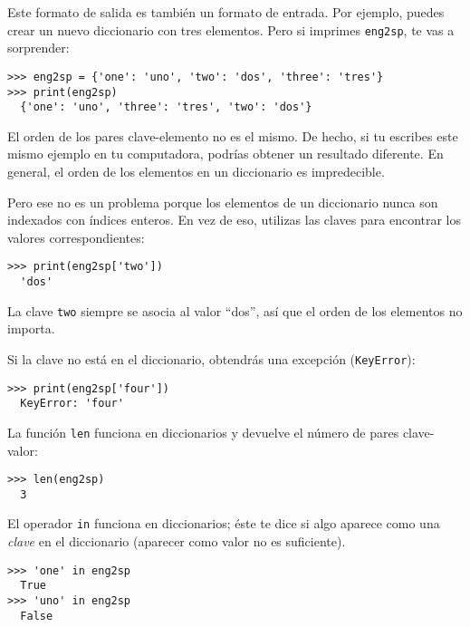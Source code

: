 Este formato de salida es también un formato de entrada. Por ejemplo,
puedes crear un nuevo diccionario con tres elementos. Pero si imprimes
\texttt{eng2sp}, te vas a sorprender:


\begin{Verbatim}[frame=single]
>>> eng2sp = {'one': 'uno', 'two': 'dos', 'three': 'tres'}
>>> print(eng2sp)
  {'one': 'uno', 'three': 'tres', 'two': 'dos'}
\end{Verbatim}


El orden de los pares clave-elemento no es el mismo. De hecho, si tu
escribes este mismo ejemplo en tu computadora, podrías obtener un
resultado diferente. En general, el orden de los elementos en un
diccionario es impredecible.

Pero ese no es un problema porque los elementos de un diccionario nunca
son indexados con índices enteros. En vez de eso, utilizas las claves
para encontrar los valores correspondientes:


\begin{Verbatim}[frame=single]
>>> print(eng2sp['two'])
  'dos'
\end{Verbatim}


La clave \texttt{\textquotesingle{}two\textquotesingle{}} siempre se
asocia al valor ``dos'', así que el orden de los elementos no importa.

Si la clave no está en el diccionario, obtendrás una excepción
(\texttt{KeyError}):

\begin{Verbatim}[frame=single]
>>> print(eng2sp['four'])
  KeyError: 'four'
\end{Verbatim}


La función \texttt{len} funciona en diccionarios y devuelve el número
de pares clave-valor:

 


\begin{Verbatim}[frame=single]
>>> len(eng2sp)
  3
\end{Verbatim}


El operador \texttt{in} funciona en diccionarios; éste te dice si algo
aparece como una \emph{clave} en el diccionario (aparecer como valor no
es suficiente).

  


\begin{Verbatim}[frame=single]
>>> 'one' in eng2sp
  True
>>> 'uno' in eng2sp
  False
\end{Verbatim}


